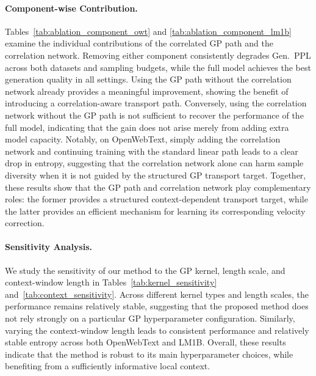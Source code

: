 \documentclass{article} %
\begin{document}
\paragraph{Component-wise Contribution.}
Tables~\ref{tab:ablation_component_owt} and \ref{tab:ablation_component_lm1b} examine the individual contributions of the correlated GP path and the correlation network. Removing either component consistently degrades Gen.~PPL across both datasets and sampling budgets, while the full model achieves the best generation quality in all settings. Using the GP path without the correlation network already provides a meaningful improvement, showing the benefit of introducing a correlation-aware transport path. Conversely, using the correlation network without the GP path is not sufficient to recover the performance of the full model, indicating that the gain does not arise merely from adding extra model capacity. Notably, on OpenWebText, simply adding the correlation network and continuing training with the standard linear path leads to a clear drop in entropy, suggesting that the correlation network alone can harm sample diversity when it is not guided by the structured GP transport target. Together, these results show that the GP path and correlation network play complementary roles: the former provides a structured context-dependent transport target, while the latter provides an efficient mechanism for learning its corresponding velocity correction.

\paragraph{Sensitivity Analysis.}
We study the sensitivity of our method to the GP kernel, length scale, and context-window length in Tables~\ref{tab:kernel_sensitivity} and~\ref{tab:context_sensitivity}. Across different kernel types and length scales, the performance remains relatively stable, suggesting that the proposed method does not rely strongly on a particular GP hyperparameter configuration. Similarly, varying the context-window length leads to consistent performance and relatively stable entropy across both OpenWebText and LM1B. Overall, these results indicate that the method is robust to its main hyperparameter choices, while benefiting from a sufficiently informative local context.
\end{document}
